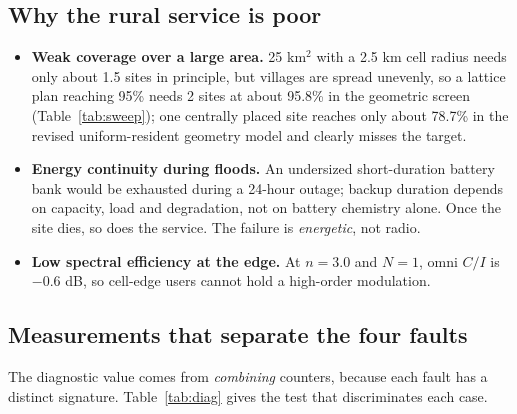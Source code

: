 \documentclass[9pt,a4paper]{extarticle}
\begin{document}
\subsection{Why the rural service is poor}
\begin{itemize}[leftmargin=1.4em,itemsep=1pt,topsep=2pt]
\item \textbf{Weak coverage over a large area.} 25 km$^2$ with a 2.5 km cell radius needs only
about 1.5 sites in principle, but villages are spread unevenly, so a lattice plan reaching 95\%
needs 2 sites at about 95.8\% in the geometric screen (Table~\ref{tab:sweep}); one centrally placed site reaches only about 78.7\% in the revised uniform-resident
geometry model and clearly misses the target.
\item \textbf{Energy continuity during floods.} An undersized short-duration battery bank would be exhausted during a 24-hour outage;
backup duration depends on capacity, load and degradation, not on battery chemistry alone. Once the site dies, so does the
service. The failure is \emph{energetic}, not radio.
\item \textbf{Low spectral efficiency at the edge.} At $n=3.0$ and $N=1$, omni $C/I$ is
$-0.6$ dB, so cell-edge users cannot hold a high-order modulation.
\end{itemize}

\subsection{Measurements that separate the four faults}
The diagnostic value comes from \emph{combining} counters, because each fault has a distinct
signature. Table~\ref{tab:diag} gives the test that discriminates each case.
\end{document}
